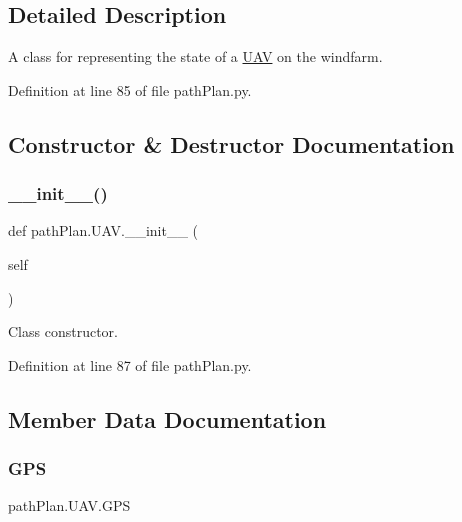 \subsection{Detailed Description}
A class for representing the state of a \mbox{\hyperlink{classpath_plan_1_1_u_a_v}{U\+AV}} on the windfarm. 

Definition at line 85 of file path\+Plan.\+py.



\subsection{Constructor \& Destructor Documentation}
\mbox{\label{classpath_plan_1_1_u_a_v_a57ea529b1f8160c59ac6d3ba1b677c37}} 
\subsubsection{\texorpdfstring{\+\_\+\+\_\+init\+\_\+\+\_\+()}{\_\_init\_\_()}}
{\footnotesize\ttfamily def path\+Plan.\+U\+A\+V.\+\_\+\+\_\+init\+\_\+\+\_\+ (\begin{DoxyParamCaption}\item[{}]{self }\end{DoxyParamCaption})}



Class constructor. 



Definition at line 87 of file path\+Plan.\+py.



\subsection{Member Data Documentation}
\mbox{\label{classpath_plan_1_1_u_a_v_a759acf47734cd05447afe9e4a3f61307}} 
\subsubsection{\texorpdfstring{G\+PS}{GPS}}
{\footnotesize\ttfamily path\+Plan.\+U\+A\+V.\+G\+PS}



